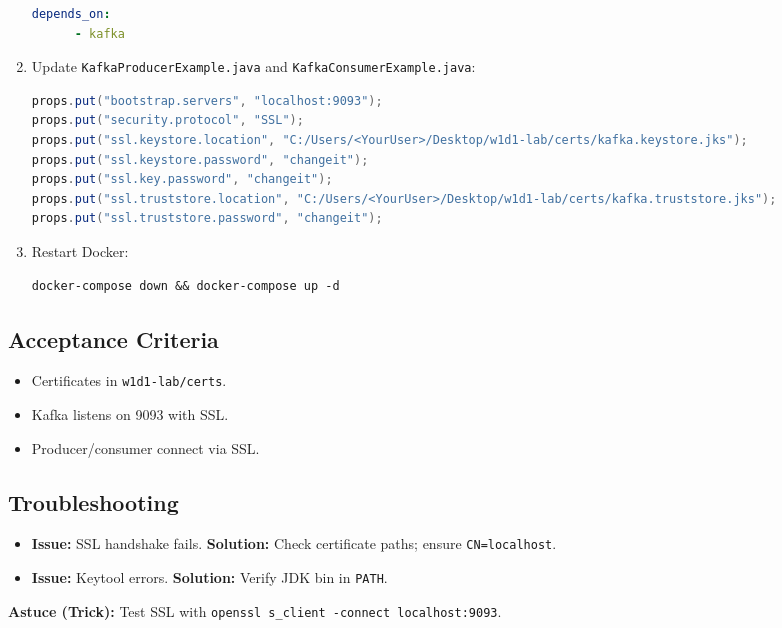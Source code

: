 \documentclass[12pt,a4paper]{report}
\begin{document}
\begin{enumerate}
\begin{lstlisting}[language=yaml]
    depends_on:
      - kafka
\end{lstlisting}
    \item Update \texttt{KafkaProducerExample.java} and \texttt{KafkaConsumerExample.java}:
\begin{lstlisting}[language=java]
props.put("bootstrap.servers", "localhost:9093");
props.put("security.protocol", "SSL");
props.put("ssl.keystore.location", "C:/Users/<YourUser>/Desktop/w1d1-lab/certs/kafka.keystore.jks");
props.put("ssl.keystore.password", "changeit");
props.put("ssl.key.password", "changeit");
props.put("ssl.truststore.location", "C:/Users/<YourUser>/Desktop/w1d1-lab/certs/kafka.truststore.jks");
props.put("ssl.truststore.password", "changeit");
\end{lstlisting}
    \item Restart Docker:
    \begin{lstlisting}
docker-compose down && docker-compose up -d
    \end{lstlisting}
\end{enumerate}

\subsection{Acceptance Criteria}
\begin{itemize}
    \item Certificates in \texttt{w1d1-lab/certs}.
    \item Kafka listens on 9093 with SSL.
    \item Producer/consumer connect via SSL.
\end{itemize}

\subsection{Troubleshooting}
\begin{itemize}
    \item \textbf{Issue:} SSL handshake fails.
      \textbf{Solution:} Check certificate paths; ensure \texttt{CN=localhost}.
    \item \textbf{Issue:} Keytool errors.
      \textbf{Solution:} Verify JDK bin in \texttt{PATH}.
\end{itemize}

\begin{framed}
\textbf{Astuce (Trick):} Test SSL with \texttt{openssl s_client -connect localhost:9093}.
\end{framed}
\end{document}
